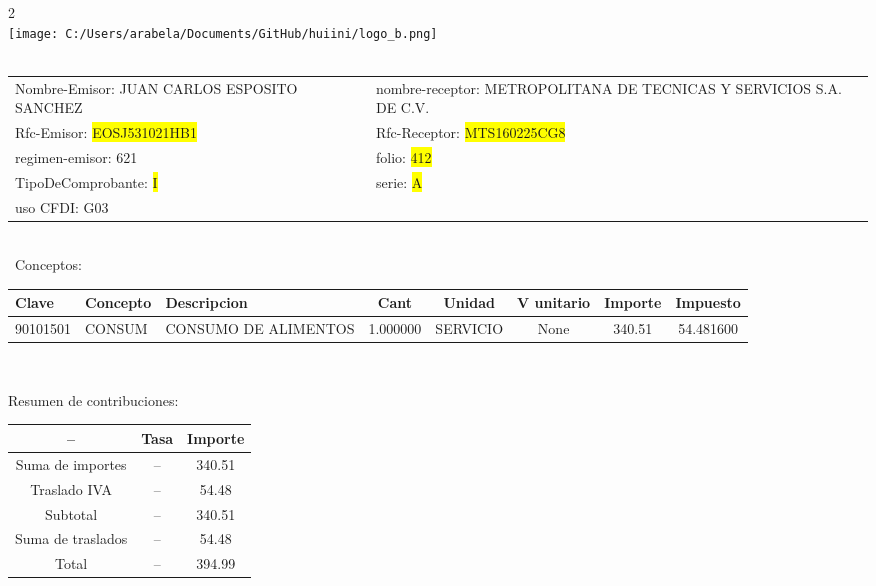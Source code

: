 \documentclass{article}
\begin{document}
\hspace{18cm} 2\\
\texttt{[image: C:/Users/arabela/Documents/GitHub/huiini/logo\_b.png]}
\bigskip\\\
\begin{tabular}{p{11cm}p{1cm}p{8cm}}

Nombre-Emisor: JUAN CARLOS ESPOSITO SANCHEZ && nombre-receptor: METROPOLITANA DE TECNICAS Y SERVICIOS S.A. DE C.V.\\

Rfc-Emisor: \colorbox{yellow}{ EOSJ531021HB1 } & & Rfc-Receptor: \colorbox{yellow}{ MTS160225CG8 }\\

regimen-emisor: 621 & & folio: \colorbox{yellow}{ 412 }\\

TipoDeComprobante: \colorbox{yellow}{ I } & & serie: \colorbox{yellow}{ A }\\

uso CFDI: G03\\



\end{tabular}
\bigskip\bigskip\bigskip\\\
Conceptos:\\
\begin{tabular}{|p{1.5cm}|p{3.6cm}|p{3.6cm}|c|c|c|c|c|}
\hline
Clave & Concepto & Descripcion & Cant & Unidad & V unitario & Importe & Impuesto \\
\hline

90101501 & CONSUM & CONSUMO DE ALIMENTOS & 1.000000 & SERVICIO & None & 340.51 &  54.481600 \\
\hline

\end{tabular}\\
\bigskip
\begin{center}
Resumen de contribuciones:\\
\bigskip
\begin{tabular}{|c|c|c|}
\hline
 -- & Tasa & Importe\\
\hline

Suma de importes & -- & 340.51 \\
\hline

Traslado IVA & -- & 54.48 \\
\hline

Subtotal  & -- & 340.51 \\
\hline

Suma de traslados & -- & 54.48 \\
\hline

Total  & -- & 394.99 \\
\hline

\end{tabular}
\end{center}
\end{document}
